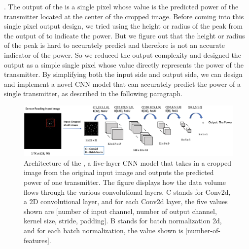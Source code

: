 .
The output of the \power is a single pixel whose value is the predicted power of the transmitter located at the center of the cropped image.
Before coming into this single pixel output design, we tried using the height or radius of the peak from the output of \imgimg to indicate the power. 
But we figure out that the height or radius of the peak is hard to accurately predict and therefore is not an accurate indicator of the power.
So we reduced the output complexity and designed the output as a simple single pixel whose value directly represents the power of the transmitter.
By simplifying both the input side and output side, we can design and implement a novel CNN model that can accurately predict the power of a single transmitter, as described in the following paragraph.

\begin{figure}
    \centering
    \includegraphics[width=\textwidth]{chapters/wowmom-pmc/figures/power_predictor.png}
    \caption{Architecture of the \power, a five-layer CNN model that takes in a cropped image from the original input image and outputs the predicted power of one transmitter. The figure displays how the data volume flows through the various convolutional layers. C stands for Conv2d, a 2D convolutional layer, and for each Conv2d layer, the five values shown are [number of input channel, number of output channel, kernel size, stride, padding]. B stands for batch normalization 2d, and for each batch normalization, the value shown is [number-of-features].}
    \label{fig:power_predict}
\end{figure}


